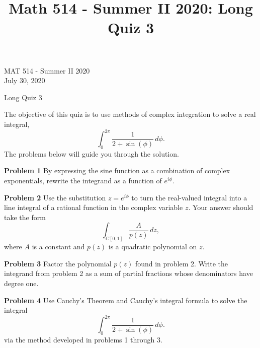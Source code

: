 \documentclass[12pt,oneside]{exam}
\title{Math 514 - Summer II 2020: Long Quiz 3}
\newenvironment{exercise}[1]{\vspace{.1in}\noindent\textbf{Problem #1 \hspace{.05em}}}{}
\begin{document}
\begin{flushright}
\sc MAT 514 - Summer II 2020\\
July 30, 2020
\end{flushright}
\bigskip
 
\begin{center}
\textsf{Long Quiz 3} 
\end{center}

The objective of this quiz is to use methods of complex integration to solve a real integral, 
\begin{equation*}
\int_{0}^{2\pi} \frac{1}{2+\sin(\phi)}\, d\phi.
\end{equation*}
The problems below will guide you through the solution. 

\begin{exercise}{1}
By expressing the sine function as a combination of complex exponentials, rewrite the integrand as a function of $e^{i\phi}$. 
\end{exercise}

\vfill

\begin{exercise}{2}
Use the substitution $z=e^{i\phi}$ to turn the real-valued integral into a line integral of a rational function in the complex variable $z$. Your answer should take the form
\begin{equation*}
\int_{C[0,1]} \frac{A}{p(z)} \, dz,
\end{equation*}
where $A$ is a constant and $p(z)$ is a quadratic polynomial on $z$.
\end{exercise}

\vfill

\newpage

\begin{exercise}{3}
Factor the polynomial $p(z)$ found in problem 2. Write the integrand from problem 2 as a sum of partial fractions whose denominators have degree one. 
\end{exercise}

\vfill

\begin{exercise}{4}
Use Cauchy's Theorem and Cauchy's integral formula to solve the integral 
\begin{equation*}
\int_{0}^{2\pi} \frac{1}{2+\sin(\phi)}\, d\phi.
\end{equation*}
via the method developed in problems 1 through 3. 
\end{exercise}

\vfill
\end{document}
